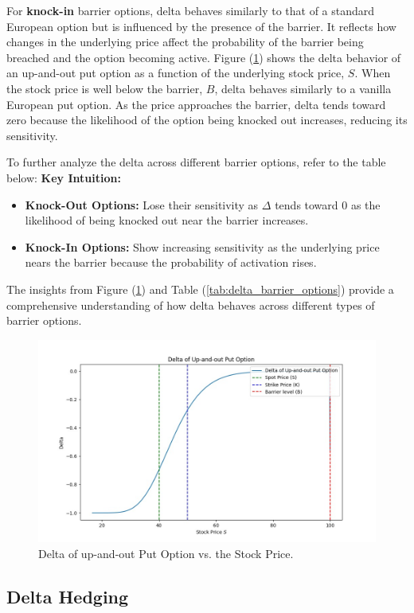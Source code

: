 For \textbf{knock-in} barrier options, delta behaves similarly to that of a standard European option but is influenced by the presence of the barrier. It reflects how changes in the underlying price affect the probability of the barrier being breached and the option becoming active. Figure (\ref{fig:delta_upout}) shows the delta behavior of an up-and-out put option as a function of the underlying stock price, $S$. When the stock price is well below the barrier, $B$, delta behaves similarly to a vanilla European put option. As the price approaches the barrier, delta tends toward zero because the likelihood of the option being knocked out increases, reducing its sensitivity.

To further analyze the delta across different barrier options, refer to the table below:
\textbf{Key Intuition:}
\begin{itemize}
    \item \textbf{Knock-Out Options:} Lose their sensitivity as $\Delta$ tends toward $0$ as the likelihood of being knocked out near the barrier increases.
    \item \textbf{Knock-In Options:} Show increasing sensitivity as the underlying price nears the barrier because the probability of activation rises.
\end{itemize}

The insights from Figure (\ref{fig:delta_upout}) and Table (\ref{tab:delta_barrier_options}) provide a comprehensive understanding of how delta behaves across different types of barrier options.
\begin{figure}[H]
    \centering
    \includegraphics[width=.65\linewidth]{content/images/delta_upout.png}
    \caption{Delta of up-and-out Put Option vs. the Stock Price.}
    \label{fig:delta_upout}
\end{figure}

\subsection{Delta Hedging}

